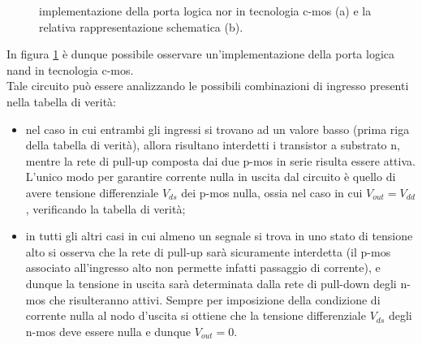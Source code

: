 	\begin{figure}[bht]
		
		\caption{implementazione della porta logica nor in tecnologia c-mos (a) e la relativa rappresentazione schematica (b).}
		\label{fig:nor:schematico}
	\end{figure}

	In figura \ref{fig:nor:schematico} è dunque possibile osservare un'implementazione della porta logica nand in tecnologia c-mos.\\
	Tale circuito può essere analizzando le possibili combinazioni di ingresso presenti nella tabella di verità:
	\begin{itemize}
		\item nel caso in cui entrambi gli ingressi si trovano ad un valore basso (prima riga della tabella di verità), allora risultano interdetti i transistor a substrato n, mentre la rete di pull-up composta dai due p-mos in serie risulta essere attiva. L'unico modo per garantire corrente nulla in uscita dal circuito è quello di avere tensione differenziale $V_{ds}$ dei p-mos nulla, ossia nel caso in cui $V_{out} = V_{dd}$, verificando la tabella di verità;
		
		\item in tutti gli altri casi in cui almeno un segnale si trova in uno stato di tensione alto si osserva che la rete di pull-up sarà sicuramente interdetta (il p-mos associato all'ingresso alto non permette infatti passaggio di corrente), e dunque la tensione in uscita sarà determinata dalla rete di pull-down degli n-mos che risulteranno attivi. Sempre per imposizione della condizione di corrente nulla al nodo d'uscita si ottiene che la tensione differenziale $V_{ds}$ degli n-mos deve essere nulla e dunque $V_{out} = 0$.
	\end{itemize}

